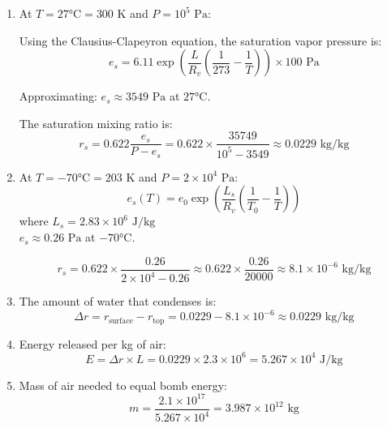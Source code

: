 \documentclass[letterpaper, 11pt]{article}
\newcommand{\1}{\mathds{1}}	%
\theoremstyle{definition}
\begin{document}
  \begin{enumerate}[label=(\alph*)]
    \item At $T = 27°\text{C} = 300\text{ K}$ and $P = 10^5\text{ Pa}$:
    
    Using the Clausius-Clapeyron equation, the saturation vapor pressure is:
    \begin{equation*}
    e_s = 6.11 \exp\left(\frac{L}{R_v}\left(\frac{1}{273} - \frac{1}{T}\right)\right) \times 100\text{ Pa}
    \end{equation*}
    
    Approximating: $e_s \approx 3549\text{ Pa}$ at $27°\text{C}$.
    
    The saturation mixing ratio is:
    \begin{equation*}
    r_s = 0.622 \frac{e_s}{P - e_s} = 0.622 \times \frac{35749}{10^5 - 3549}  \approx 0.0229\text{ kg/kg}
    \end{equation*}
    
    \item At $T = -70°\text{C} = 203\text{ K}$ and $P = 2 \times 10^4\text{ Pa}$:
    \begin{equation*}
e_s(T) = e_0 \exp\left(\frac{L_s}{R_v}\left(\frac{1}{T_0} - \frac{1}{T}\right)\right)
\end{equation*} where $L_s = 2.83 \times 10^6\text{ J/kg}$
    \\$e_s \approx 0.26\text{ Pa}$ at $-70°\text{C}$.
    
    \begin{equation*}
    r_s = 0.622 \times \frac{0.26}{2 \times 10^4 - 0.26} \approx 0.622 \times \frac{0.26}{20000} \approx 8.1 \times 10^{-6}\text{ kg/kg}
    \end{equation*}
    
    \item The amount of water that condenses is:
    \begin{equation*}
    \Delta r = r_{\text{surface}} - r_{\text{top}} = 0.0229 - 8.1 \times 10^{-6} \approx 0.0229\text{ kg/kg}
    \end{equation*}
    
    \item Energy released per kg of air:
    \begin{equation*}
    E = \Delta r \times L = 0.0229 \times 2.3 \times 10^6 = 5.267 \times 10^4\text{ J/kg}
    \end{equation*}
    
    \item Mass of air needed to equal bomb energy:
    \begin{equation*}
    m = \frac{2.1 \times 10^{17}}{5.267 \times 10^4} = 3.987 \times 10^{12}\text{ kg}
    \end{equation*}
    

\end{enumerate}
\end{document}
